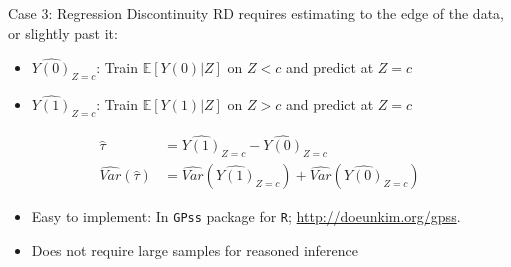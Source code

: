 \documentclass[xcolor=dvipsnames]{beamer}
\newcommand\E{\mathbb{E}}
\begin{document}



\begin{frame}{Case 3: Regression Discontinuity}
\bigskip
 RD requires estimating to the edge of the data, or slightly past it: \\
\small
         \begin{itemize}
             \item  $\widehat{Y(0)}_{Z=c}$: Train $\E[Y(0)|Z]$ on $Z<c$ and predict at $Z=c$ 
             \item  $\widehat{Y(1)}_{Z=c}$: Train $\E[Y(1)|Z]$ on $Z>c$ and predict at $Z=c$
 \end{itemize}
 \begin{align*}
   \hat{\tau} &= \widehat{Y(1)}_{Z=c} - \widehat{Y(0)}_{Z=c} \\
    \widehat{Var}(\hat{\tau}) &=  \widehat{Var}(\widehat{Y(1)}_{Z=c}) + \widehat{Var}(\widehat{Y(0)}_{Z=c})
\end{align*}
\begin{itemize}
\item<2-> Easy to implement: In \texttt{GPss} package for \texttt{R};  \href{https://doeunkim.org/gpss/}{http://doeunkim.org/gpss}. 
\item<3-> Does not require large samples for reasoned inference
\end{itemize}
\end{frame}
\end{document}
